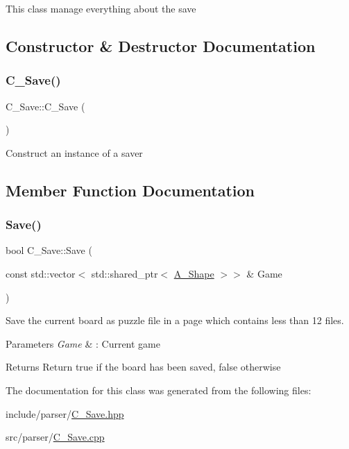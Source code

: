 This class manage everything about the save 

\subsection{Constructor \& Destructor Documentation}
\mbox{\label{classC__Save_adc49f753d7b0f40c95ec2b93f81b9672}} 
\subsubsection{\texorpdfstring{C\+\_\+\+Save()}{C\_Save()}}
{\footnotesize\ttfamily C\+\_\+\+Save\+::\+C\+\_\+\+Save (\begin{DoxyParamCaption}{ }\end{DoxyParamCaption})}

Construct an instance of a saver 

\subsection{Member Function Documentation}
\mbox{\label{classC__Save_a144be848679b771afb9cf410710308e8}} 
\subsubsection{\texorpdfstring{Save()}{Save()}}
{\footnotesize\ttfamily bool C\+\_\+\+Save\+::\+Save (\begin{DoxyParamCaption}\item[{const std\+::vector$<$ std\+::shared\+\_\+ptr$<$ \hyperlink{classA__Shape}{A\+\_\+\+Shape} $>$$>$ \&}]{Game }\end{DoxyParamCaption})}



Save the current board as puzzle file in a page which contains less than 12 files. 


\begin{DoxyParams}{Parameters}
{\em Game} & \+: Current game \\
\hline
\end{DoxyParams}
\begin{DoxyReturn}{Returns}
Return true if the board has been saved, false otherwise 
\end{DoxyReturn}


The documentation for this class was generated from the following files\+:\begin{DoxyCompactItemize}
\item 
include/parser/\hyperlink{C__Save_8hpp}{C\+\_\+\+Save.\+hpp}\item 
src/parser/\hyperlink{C__Save_8cpp}{C\+\_\+\+Save.\+cpp}\end{DoxyCompactItemize}

